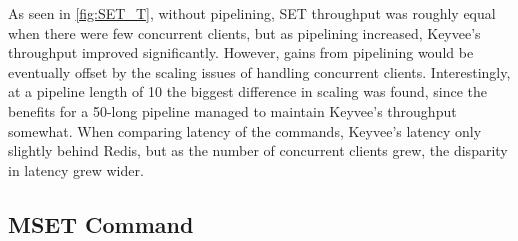 \documentclass[english,10pt,twocolumn]{article}
\begin{document}
As seen in \ref{fig:SET_T}, without pipelining, SET throughput was roughly equal when there were few concurrent clients, but as pipelining increased, Keyvee's throughput improved significantly. 
However, gains from pipelining would be eventually offset by the scaling issues of handling concurrent clients.
Interestingly, at a pipeline length of 10 the biggest difference in scaling was found, since the benefits for a 50-long pipeline managed to maintain Keyvee's throughput somewhat.
When comparing latency of the commands, Keyvee's latency only slightly behind Redis, but as the number of concurrent clients grew, the disparity in latency grew wider.

\subsection{MSET Command}
\end{document}
